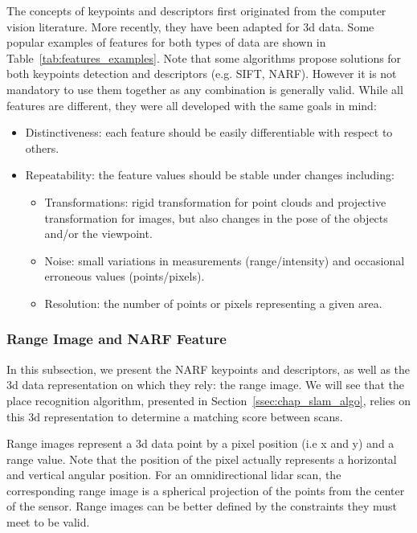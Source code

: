The concepts of keypoints and descriptors first originated from the computer vision literature. More recently, they have been adapted for \gls*{3d} data. Some popular examples of features for both types of data are shown in Table~\ref{tab:features_examples}. Note that some algorithms propose solutions for both keypoints detection and descriptors (e.g. SIFT, NARF). However it is not mandatory to use them together as any combination is generally valid. While all features are different, they were all developed with the same goals in mind:
\begin{itemize}[label=$\bullet$,noitemsep,topsep=0pt]
    \item Distinctiveness: each feature should be easily differentiable with respect to others.
    \item Repeatability: the feature values should be stable under changes including:
        \begin{itemize}[label=$\circ$,noitemsep,topsep=0pt]
            \item Transformations: rigid transformation for point clouds and projective transformation for images, but also changes in the pose of the objects and/or the viewpoint.
            \item Noise: small variations in measurements (range/intensity) and occasional erroneous values (points/pixels).
            \item Resolution: the number of points or pixels representing a given area.
        \end{itemize}
\end{itemize}


\subsubsection{Range Image and NARF Feature}
\label{ssub:NARF Features and Range Image}

In this subsection, we present the NARF keypoints and descriptors, as well as the \gls*{3d} data representation on which they rely: the range image. We will see that the place recognition algorithm, presented in Section~\ref{ssec:chap_slam_algo}, relies on this \gls*{3d} representation to determine a matching score between scans.

Range images represent a \gls*{3d} data point by a pixel position (i.e x and y) and a range value. Note that the position of the pixel actually represents a horizontal and vertical angular position. For an omnidirectional \gls*{lidar} scan, the corresponding range image is a spherical projection of the points from the center of the sensor. Range images can be better defined by the constraints they must meet to be valid.

